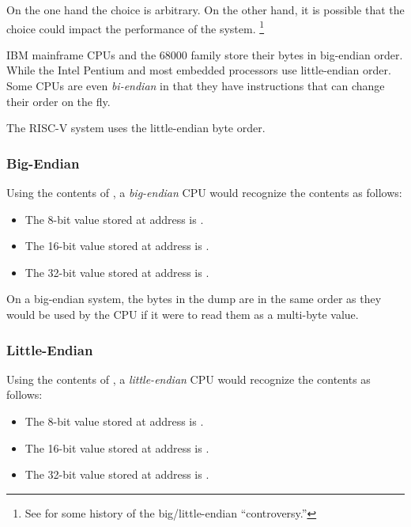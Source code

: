 On the one hand the choice is arbitrary.  On the other hand, it is 
possible that the choice could impact the performance of the system.%
\footnote{See\cite{IEN137} for some history of the big/little-endian ``controversy.''}

IBM mainframe CPUs and the 68000 family store their bytes in big-endian 
order.  While the Intel Pentium and most embedded processors use
little-endian order.  
Some CPUs are even {\em bi-endian} in that they have instructions that
can change their order on the fly. 

The RISC-V system uses the little-endian byte order.

\subsubsection{Big-Endian}
\label{BigEndian}

Using the contents of , a {\em big-endian}
CPU would recognize the contents as follows:

\begin{itemize}
\item The 8-bit value stored at address  is .
\item The 16-bit value stored at address  is .
\item The 32-bit value stored at address  is .
\end{itemize}

\begin{tcolorbox}
On a big-endian system, the bytes in the dump are in the same order as 
they would be used by the CPU if it were to read them as a multi-byte 
value.
\end{tcolorbox}

\subsubsection{Little-Endian}
\label{LittleEndian}

Using the contents of , a {\em little-endian} 
CPU would recognize the contents as follows:

\begin{itemize}
\item The 8-bit value stored at address  is .
\item The 16-bit value stored at address  is .
\item The 32-bit value stored at address  is .
\end{itemize}

